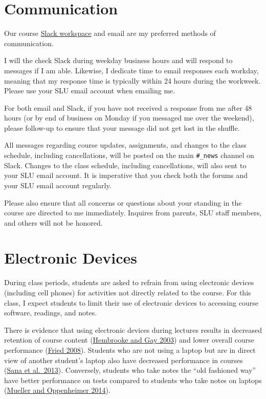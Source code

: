 \documentclass[]{book}
\begin{document}
\hypertarget{communication}{%
\section{Communication}\label{communication}}

Our course \href{http://slu-soc5650.slack.com}{Slack workspace} and email are my preferred methods of communication.

I will the check Slack during weekday business hours and will respond to messages if I am able. Likewise, I dedicate time to email responses each workday, meaning that my response time is typically within 24 hours during the workweek. Please use your SLU email account when emailing me.

For both email and Slack, if you have not received a response from me after 48 hours (or by end of business on Monday if you messaged me over the weekend), please follow-up to ensure that your message did not get lost in the shuffle.

All messages regarding course updates, assignments, and changes to the class schedule, including cancellations, will be posted on the main \texttt{\#\_news} channel on Slack. Changes to the class schedule, including cancellations, will also sent to your SLU email account. It is imperative that you check both the forums and your SLU email account regularly.

Please also ensure that all concerns or questions about your standing in the course are directed to me immediately. Inquires from parents, SLU staff members, and others will not be honored.

\hypertarget{electronic-devices}{%
\section{Electronic Devices}\label{electronic-devices}}

During class periods, students are asked to refrain from using electronic devices (including cell phones) for activities not directly related to the course. For this class, I expect students to limit their use of electronic devices to accessing course software, readings, and notes.

There is evidence that using electronic devices during lectures results in decreased retention of course content (\href{https://link.springer.com/article/10.1007/BF02940852}{Hembrooke and Gay 2003}) and lower overall course performance (\href{https://www.sciencedirect.com/science/article/pii/S0360131506001436}{Fried 2008}). Students who are not using a laptop but are in direct view of another student's laptop also have decreased performance in courses (\href{https://www.sciencedirect.com/science/article/pii/S0360131512002254}{Sana et al.~2013}). Conversely, students who take notes the ``old fashioned way'' have better performance on tests compared to students who take notes on laptops (\href{http://journals.sagepub.com/doi/abs/10.1177/0956797614524581}{Mueller and Oppenheimer 2014}).
\end{document}
